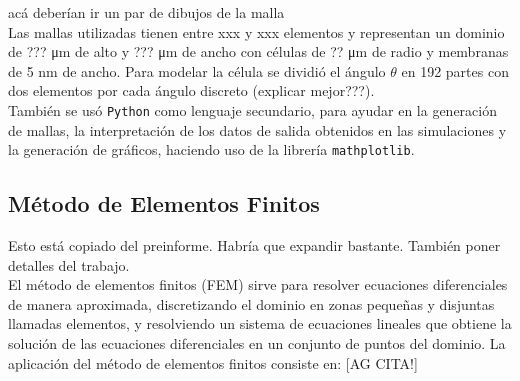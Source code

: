 acá deberían ir un par de dibujos de la malla\\

Las mallas utilizadas tienen entre xxx y xxx elementos y representan un dominio de ??? \si{\micro\metre} de alto y ??? \si{\micro\metre} de ancho con células de ?? \si{\micro\metre} de radio y membranas de 5 \si{\nano\metre} de ancho. Para modelar la célula se dividió el ángulo $\theta$ en 192 partes con dos elementos por cada ángulo discreto (explicar mejor???).\\

También se usó \texttt{Python} como lenguaje secundario, para ayudar en la generación de mallas, la interpretación de los datos de salida obtenidos en las simulaciones y la generación de gráficos, haciendo uso de la librería \texttt{mathplotlib}.


\subsection{Método de Elementos Finitos}

Esto está copiado del preinforme. Habría que expandir bastante. También poner detalles del trabajo.\\

El método de elementos finitos (FEM) sirve para resolver ecuaciones diferenciales de manera aproximada, discretizando el dominio en zonas pequeñas y disjuntas llamadas elementos, y resolviendo un sistema de ecuaciones lineales que obtiene la solución de las ecuaciones diferenciales en un conjunto de puntos del dominio. La aplicación del método de elementos finitos consiste en: [AG CITA!] %


